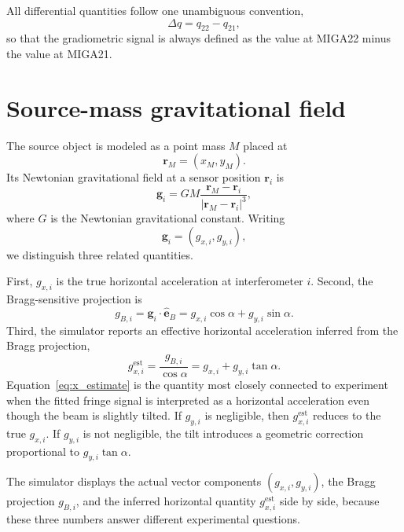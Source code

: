 \documentclass[11pt]{article}
\begin{document}
All differential quantities follow one unambiguous convention,
\begin{equation}
\Delta q = q_{22} - q_{21},
\end{equation}
so that the gradiometric signal is always defined as the value at MIGA22 minus the value at MIGA21.

\section{Source-mass gravitational field}

The source object is modeled as a point mass $M$ placed at
\begin{equation}
\mathbf{r}_{M} = (x_M, y_M).
\end{equation}
Its Newtonian gravitational field at a sensor position $\mathbf{r}_i$ is
\begin{equation}
\mathbf{g}_i = G M \frac{\mathbf{r}_{M} - \mathbf{r}_i}{\left|\mathbf{r}_{M} - \mathbf{r}_i\right|^3},
\label{eq:newton_field}
\end{equation}
where $G$ is the Newtonian gravitational constant. Writing
\begin{equation}
\mathbf{g}_i = (g_{x,i}, g_{y,i}),
\end{equation}
we distinguish three related quantities.

First, $g_{x,i}$ is the true horizontal acceleration at interferometer $i$. Second, the Bragg-sensitive projection is
\begin{equation}
 g_{B,i} = \mathbf{g}_i \cdot \hat{\mathbf{e}}_{B} = g_{x,i}\cos\alpha + g_{y,i}\sin\alpha.
 \label{eq:bragg_projection}
\end{equation}
Third, the simulator reports an effective horizontal acceleration inferred from the Bragg projection,
\begin{equation}
 g^{\mathrm{est}}_{x,i} = \frac{g_{B,i}}{\cos\alpha} = g_{x,i} + g_{y,i}\tan\alpha.
 \label{eq:x_estimate}
\end{equation}
Equation~\eqref{eq:x_estimate} is the quantity most closely connected to experiment when the fitted fringe signal is interpreted as a horizontal acceleration even though the beam is slightly tilted. If $g_{y,i}$ is negligible, then $g^{\mathrm{est}}_{x,i}$ reduces to the true $g_{x,i}$. If $g_{y,i}$ is not negligible, the tilt introduces a geometric correction proportional to $g_{y,i}\tan\alpha$.

The simulator displays the actual vector components $(g_{x,i}, g_{y,i})$, the Bragg projection $g_{B,i}$, and the inferred horizontal quantity $g^{\mathrm{est}}_{x,i}$ side by side, because these three numbers answer different experimental questions.
\end{document}
